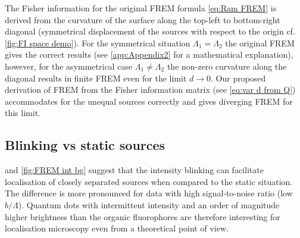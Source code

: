 The Fisher information for the original FREM formula \autoref{eq:Ram FREM} is derived from the curvature of the surface along the top-left to bottom-right diagonal (symmetrical displacement of the sources with respect to the origin cf. \autoref{fig:FI space demo}). For the symmetrical situation $\Lambda_1=\Lambda_2$ the original FREM gives the correct results (see \autoref{app:Appendix2} for a mathematical explanation), however, for the asymmetrical case $\Lambda_1\neq\Lambda_2$ the non-zero curvature along the diagonal results in finite FREM even for the limit $d\rightarrow 0$. Our proposed derivation of FREM from the Fisher information matrix (see \autoref{eq:var d from Q}) accommodates for the unequal sources correctly and gives diverging FREM for this limit. 


\subsection{Blinking vs static sources\label{sub:Blink vs static}}

 and \autoref{fig:FREM int bg} suggest that the intensity blinking can facilitate localisation of closely separated sources when compared to the static situation. The difference is more pronounced for data with high signal-to-noise ratio (low $b/\Lambda$). Quantum dots with intermittent intensity and an order of magnitude higher brightness than the organic fluorophores are therefore interesting for localisation microscopy even from a theoretical point of view.


